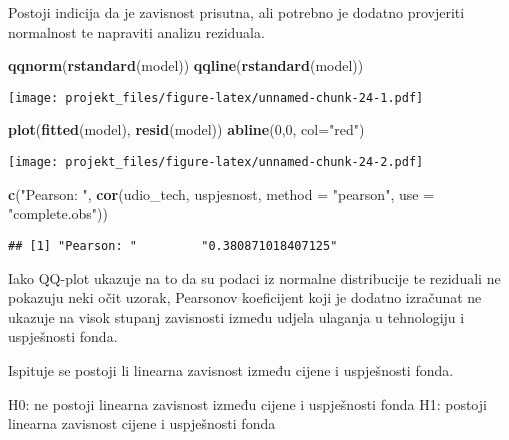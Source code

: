 \documentclass[
]{article}
\newenvironment{Shaded}{\begin{snugshade}}{\end{snugshade}}
\newcommand{\DataTypeTok}[1]{\textcolor[rgb]{0.13,0.29,0.53}{#1}}
\newcommand{\DecValTok}[1]{\textcolor[rgb]{0.00,0.00,0.81}{#1}}
\newcommand{\KeywordTok}[1]{\textcolor[rgb]{0.13,0.29,0.53}{\textbf{#1}}}
\newcommand{\NormalTok}[1]{#1}
\newcommand{\StringTok}[1]{\textcolor[rgb]{0.31,0.60,0.02}{#1}}
\begin{document}
Postoji indicija da je zavisnost prisutna, ali potrebno je dodatno
provjeriti normalnost te napraviti analizu reziduala.

\begin{Shaded}
\begin{Highlighting}[]
\KeywordTok{qqnorm}\NormalTok{(}\KeywordTok{rstandard}\NormalTok{(model))}
\KeywordTok{qqline}\NormalTok{(}\KeywordTok{rstandard}\NormalTok{(model))}
\end{Highlighting}
\end{Shaded}

\texttt{[image: projekt\_files/figure-latex/unnamed-chunk-24-1.pdf]}

\begin{Shaded}
\begin{Highlighting}[]
\KeywordTok{plot}\NormalTok{(}\KeywordTok{fitted}\NormalTok{(model), }\KeywordTok{resid}\NormalTok{(model))}
\KeywordTok{abline}\NormalTok{(}\DecValTok{0}\NormalTok{,}\DecValTok{0}\NormalTok{, }\DataTypeTok{col=}\StringTok{"red"}\NormalTok{)}
\end{Highlighting}
\end{Shaded}

\texttt{[image: projekt\_files/figure-latex/unnamed-chunk-24-2.pdf]}

\begin{Shaded}
\begin{Highlighting}[]
\KeywordTok{c}\NormalTok{(}\StringTok{"Pearson: "}\NormalTok{, }\KeywordTok{cor}\NormalTok{(udio_tech, uspjesnost, }\DataTypeTok{method =} \StringTok{"pearson"}\NormalTok{, }\DataTypeTok{use =} \StringTok{"complete.obs"}\NormalTok{))}
\end{Highlighting}
\end{Shaded}

\begin{verbatim}
## [1] "Pearson: "         "0.380871018407125"
\end{verbatim}

Iako QQ-plot ukazuje na to da su podaci iz normalne distribucije te
reziduali ne pokazuju neki očit uzorak, Pearsonov koeficijent koji je
dodatno izračunat ne ukazuje na visok stupanj zavisnosti između udjela
ulaganja u tehnologiju i uspješnosti fonda.

Ispituje se postoji li linearna zavisnost između cijene i uspješnosti
fonda.

H0: ne postoji linearna zavisnost između cijene i uspješnosti fonda H1:
postoji linearna zavisnost cijene i uspješnosti fonda
\end{document}
